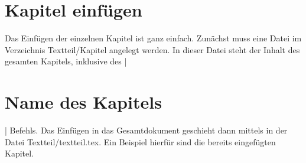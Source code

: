 
\chapter{Kapitel einfügen}

Das Einfügen der einzelnen Kapitel ist ganz einfach. 
Zunächst muss eine Datei im Verzeichnis Textteil/Kapitel angelegt werden. 
In dieser Datei steht der Inhalt des gesamten Kapitels, inklusive des \befehl|\chapter {Name des Kapitels}| Befehls. 
Das Einfügen in das Gesamtdokument geschieht dann mittels \befehl{} in der Datei Textteil/textteil.tex.
Ein Beispiel hierfür sind die bereits eingefügten Kapitel.